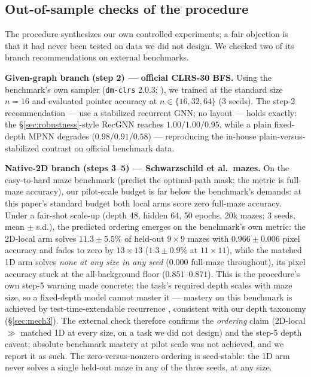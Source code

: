 \documentclass[11pt]{article}
\begin{document}
\subsection{Out-of-sample checks of the procedure}\label{sec:external}

The procedure synthesizes our own controlled experiments; a fair objection is
that it had never been tested on data we did not design. We checked two of
its branch recommendations on external benchmarks.

\textbf{Given-graph branch (step 2) --- official CLRS-30 BFS.} Using the
benchmark's own sampler (\texttt{dm-clrs} 2.0.3;
\citealp{velickovic2022clrs}), we trained at the standard size $n = 16$ and
evaluated pointer accuracy at $n \in \{16, 32, 64\}$ (3 seeds). The step-2
recommendation --- use a stabilized recurrent GNN; no layout --- holds
exactly: the \S\ref{sec:robustness}-style RecGNN reaches
$1.00 / 1.00 / 0.95$, while a plain fixed-depth MPNN degrades
($0.98 / 0.91 / 0.58$) --- reproducing the in-house plain-versus-stabilized
contrast on official benchmark data.

\textbf{Native-2D branch (steps 3--5) --- Schwarzschild et al.\ mazes.} On
the easy-to-hard maze benchmark \citep{schwarzschild2021canyou} (predict the
optimal-path mask; the metric is full-maze accuracy), our pilot-scale budget
is far below the benchmark's demands: at this paper's standard budget both
local arms score zero full-maze accuracy. Under a fair-shot scale-up (depth
48, hidden 64, 50 epochs, 20k mazes; 3 seeds, mean $\pm$ s.d.), the predicted
ordering emerges on the benchmark's own metric: the 2D-local arm solves
$11.3 \pm 5.5\%$ of held-out $9 \times 9$ mazes with $0.966 \pm 0.006$ pixel
accuracy and fades to zero by $13 \times 13$ ($1.3 \pm 0.9\%$ at
$11 \times 11$), while the matched 1D arm solves \emph{none at any size in
any seed} ($0.000$ full-maze throughout), its pixel accuracy stuck at the
all-background floor ($0.851$--$0.871$).
This is the procedure's own step-5 warning made concrete: the task's
required depth scales with maze size, so a fixed-depth model cannot master
it --- mastery on this benchmark is achieved by test-time-extendable
recurrence \citep{schwarzschild2021canyou}, consistent with our depth
taxonomy (\S\ref{sec:mech3}). The external check therefore confirms the
\emph{ordering} claim (2D-local $\gg$ matched 1D at every size, on a task we
did not design) and the step-5 depth caveat; absolute benchmark mastery at
pilot scale was not achieved, and we report it as such. The zero-versus-nonzero
ordering is seed-stable: the 1D arm never solves a single held-out maze in
any of the three seeds, at any size.
\end{document}
